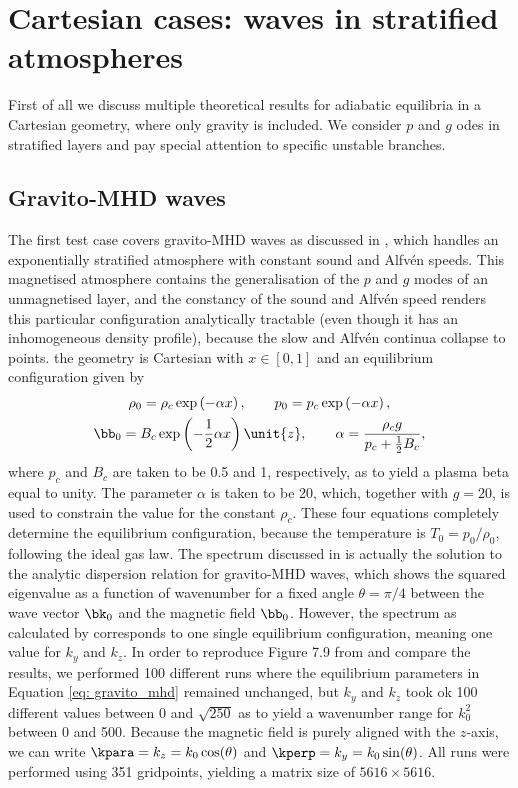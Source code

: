 \section{Cartesian cases: waves in stratified atmospheres}
First of all we discuss multiple theoretical results for adiabatic equilibria in a Cartesian geometry, where only gravity is included. We consider $p$ and $g$ odes in stratified layers and pay special attention to specific unstable branches.

\subsection{Gravito-MHD waves} \label{ss: gravito-mhd}
The first test case covers gravito-MHD waves as discussed in \citet[Figure 7.9]{book_MHD}, which handles an exponentially stratified atmosphere with constant sound and Alfv\'en speeds. This magnetised atmosphere contains the generalisation of the $p$ and $g$ modes of an unmagnetised layer, and the constancy of the sound and Alfv\'en speed renders this particular configuration analytically tractable (even though it has an inhomogeneous density profile), because the slow and Alfv\'en continua collapse to points. the geometry is Cartesian with $x \in [0, 1]$ and an equilibrium configuration given by
\begin{equation} \label{eq: gravito_mhd}
  \begin{gathered}
    \rho_0 = \rho_c \exp\left(-\alpha x\right), \qquad p_0 = p_c \exp\left(-\alpha x\right), \\
    \bb_0 = B_c \exp\left(-\frac{1}{2}\alpha x\right)\unit{z}, \qquad \alpha = \frac{\rho_c g}{p_c + \frac{1}{2}B_c},
  \end{gathered}
\end{equation}
where $p_c$ and $B_c$ are taken to be 0.5 and 1, respectively, as to yield a plasma beta equal to unity. The parameter $\alpha$ is taken to be 20, which, together with $g = 20$, is used to constrain the value for the constant $\rho_c$. These four equations completely determine the equilibrium configuration, because the temperature is $T_0 = p_0/\rho_0$, following the ideal gas law. The spectrum discussed in \citet{book_MHD} is actually the solution to the analytic dispersion relation for gravito-MHD waves, which shows the squared eigenvalue as a function of wavenumber for a fixed angle $\theta = \pi / 4$ between the wave vector $\bk_0$ and the magnetic field $\bb_0$. However, the spectrum as calculated by {\legolas} corresponds to one single equilibrium configuration, meaning one value for $k_y$ and $k_z$. In order to reproduce Figure 7.9 from \citet{book_MHD} and compare the results, we performed 100 different runs where the equilibrium parameters in Equation \eqref{eq: gravito_mhd} remained unchanged, but $k_y$ and $k_z$ took ok 100 different values between $0$ and $\sqrt{250}$ as to yield a wavenumber range for $k_0^2$ between 0 and 500. Because the magnetic field is purely aligned with the $z$-axis, we can write $\kpara = k_z = k_0\cos(\theta)$ and $\kperp = k_y = k_0\sin(\theta)$. All runs were performed using 351 gridpoints, yielding a matrix size of $5616 \times 5616$.

